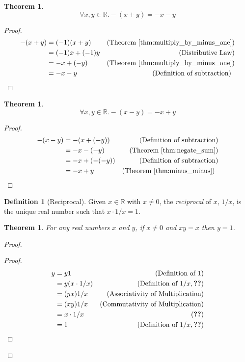 \documentclass{report}
\let\qed\relax
\newtheorem{thm}[ax]{Theorem}
\theoremstyle{definition}
\newtheorem{df}[ax]{Definition}
\begin{document}
\begin{thm}
\label{thm:negate_sum}
\[ \forall x,y \in \mathbb{R}. -(x+y) = -x-y \]
\end{thm}

\begin{proof}
\pf
\begin{align*}
-(x+y) & = (-1)(x+y) & (\text{Theorem \ref{thm:multiply_by_minus_one}}) \\
& = (-1)x + (-1)y & (\text{Distributive Law}) \\
& = -x + (-y) & (\text{Theorem \ref{thm:multiply_by_minus_one}}) \\
& = -x-y & (\text{Definition of subtraction}) \enspace \qed
\end{align*}
\end{proof}

\begin{thm}
\[ \forall x,y \in \mathbb{R}. -(x-y) = -x+y \]
\end{thm}

\begin{proof}
\pf
\begin{align*}
-(x-y) & = -(x + (-y)) & (\text{Definition of subtraction}) \\
& = -x-(-y) & (\text{Theorem \ref{thm:negate_sum}}) \\
& = -x + (-(-y)) & (\text{Definition of subtraction}) \\
& = -x + y & (\text{Theorem \ref{thm:minus_minus}}) \enspace \qed
\end{align*}
\end{proof}

\begin{df}[Reciprocal]
Given $x \in \mathbb{R}$ with $x \neq 0$, the \emph{reciprocal} of $x$, $1/x$, is the unique real number such that $x \cdot 1/x = 1$.
\end{df}

\begin{thm}
For any real numbers $x$ and $y$, if $x \neq 0$ and $xy = x$ then $y = 1$.
\end{thm}

\begin{proof}
\pf
{}
\begin{proof}
	\pf
	\begin{align*}
		y & = y1 & (\text{Definition of } 1) \\
		& = y (x \cdot 1/x) & (\text{Definition of } 1/x, \text{\stepref{2}}) \\
		& = (yx) 1/x & (\text{Associativity of Multiplication}) \\
		& = (xy) 1/x & (\text{Commutativity of Multiplication}) \\
		& = x \cdot 1/x & (\text{\stepref{3}}) \\
		& = 1 & (\text{Definition of } 1/x, \text{\stepref{2}})
	\end{align*}
\end{proof}
\qed
\end{proof}
\end{document}

